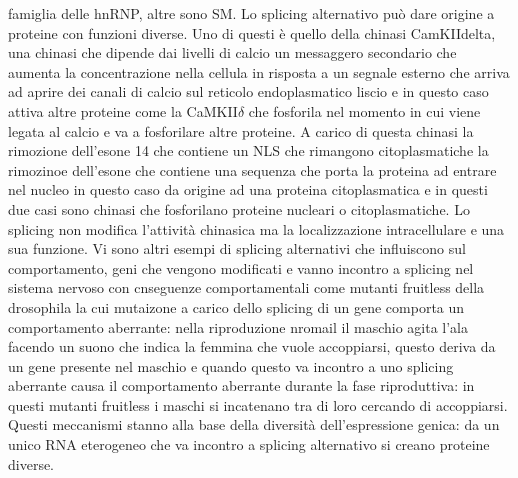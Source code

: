 famiglia delle hnRNP, altre sono SM. Lo splicing alternativo pu\`o dare origine a proteine con funzioni diverse. Uno di questi \`e quello della chinasi CamKIIdelta, una chinasi che 
dipende dai livelli di calcio un messaggero secondario che aumenta la concentrazione nella cellula in risposta a un segnale esterno che arriva ad aprire dei canali di calcio sul
reticolo endoplasmatico liscio e in questo caso attiva altre proteine come la CaMKII$\delta$ che fosforila nel momento in cui viene legata al calcio e va a fosforilare altre proteine. 
A carico di questa chinasi la rimozione dell'esone 14 che contiene un NLS che rimangono citoplasmatiche la rimozinoe dell'esone che contiene una sequenza che porta la proteina ad entrare
nel nucleo in questo caso da origine ad una proteina citoplasmatica e in questi due casi sono chinasi che fosforilano proteine nucleari o citoplasmatiche. Lo splicing non modifica
l'attivit\`a chinasica ma la localizzazione intracellulare e una sua funzione. Vi sono altri esempi di splicing alternativi che influiscono sul comportamento, geni che vengono modificati
e vanno incontro a splicing nel sistema nervoso con cnseguenze comportamentali come mutanti fruitless della drosophila la cui mutaizone a carico dello splicing di un gene comporta un
comportamento aberrante: nella riproduzione nromail il maschio agita l'ala facendo un suono che indica la femmina che vuole accoppiarsi, questo deriva da un gene presente nel maschio e
quando questo va incontro a uno splicing aberrante causa il comportamento aberrante durante la fase riproduttiva: in questi mutanti fruitless i maschi si incatenano tra di loro cercando 
di accoppiarsi. Questi meccanismi stanno alla base della diversit\`a dell'espressione genica: da un unico RNA eterogeneo che va incontro a splicing alternativo si creano proteine 
diverse. 
